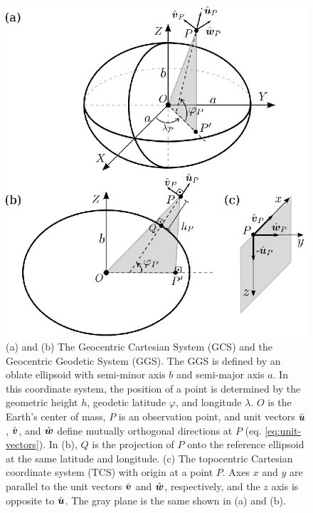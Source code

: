 \documentclass[extra]{gji}
\newcommand{\versor}[1]{\hat{\mitbf{#1}}}
\begin{document}
\begin{figure}
    \includegraphics{figures/cartesian-geodetic-systems.eps}
    \caption{
    (a) and (b) The Geocentric Cartesian System (GCS) and the Geocentric
    Geodetic System (GGS).
    The GGS is defined by an oblate ellipsoid with semi-minor axis $b$ and
    semi-major axis $a$.
    In this coordinate system, the position of a point is determined by the
    geometric height $h$, geodetic latitude $\varphi$, and longitude $\lambda$.
    $O$ is the Earth's center of mass, $P$ is an observation point, and
    unit vectors $\versor{u}$, $\versor{v}$, and $\versor{w}$ define mutually
    orthogonal directions at $P$ (eq. \ref{eq:unit-vectors}).
    In (b), $Q$ is the projection of $P$ onto the reference ellipsoid at
    the same latitude and longitude.
    (c) The topocentric Cartesian coordinate system (TCS) with origin at a
    point $P$.
    Axes $x$ and $y$ are parallel to the unit vectors $\versor{v}$ and
    $\versor{w}$, respectively, and the $z$ axis is opposite to $\versor{u}$.
    The gray plane is the same shown in (a) and (b).
    }
  \label{fig:systems}
\end{figure}
\end{document}
